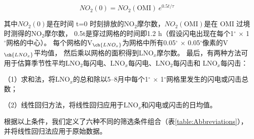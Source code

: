 \begin{equation} \label{eq:inition}
NO_2(0) = NO_2(\mathrm{OMI})\ e^{0.5t/\tau}
\end{equation}

其中$NO_2(0)$是在时间 t=0 时刻排放的NO$_2$摩尔数，$NO_2(\mathrm{OMI})$是在 OMI 过境时测得的NO$_2$摩尔数，
0.5t是穿过网格的时间即1.2 h（假设闪电出现在每个1$^{\circ}$ $\times$ 1$^{\circ}$网格的中心）。
每个网格的V$_{\ch{LNO_x}}$为网格中所有0.05$^{\circ}$ $\times$ 0.05$^{\circ}$像素的V$_{\ch{LNO_x}}$平均值，
然后乘以网格的面积得到LNO$_x$摩尔数。
最后，有两种方法可用于估算季节性平均LNO$_2$每闪电、LNO$_x$每闪电、LNO$_2$每闪击和 LNO$_x$每闪击：

（1）求和法，将LNO$_x$的总和除以5--8月中每个1$^{\circ}$ $\times$ 1$^{\circ}$网格里发生的闪电或闪击总数；

（2）线性回归方法，将线性回归应用于LNO$_x$和闪电或闪击的日均值。


根据以上条件，我们定义了六种不同的筛选条件组合（表\ref{table:Abbreviations}），并将线性回归法应用于原始数据。

